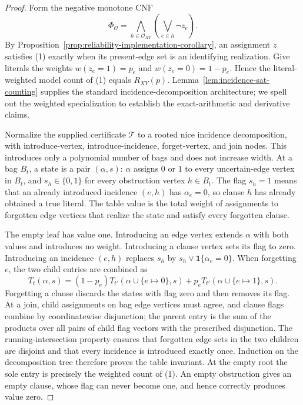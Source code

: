 \documentclass{article}
\begin{document}
\begin{proof}
Form the negative monotone CNF
\[
 \Phi_{\mathcal O}=\bigwedge_{h\in\mathcal O_{XY}}
 \left(\bigvee_{e\in h}\neg z_e\right). \tag{1}
\]
By Proposition~\ref{prop:reliability-implementation-corollary}, an assignment \(z\) satisfies (1) exactly when its present-edge set is an identifying realization.  Give literals the weights \(w(z_e=1)=p_e\) and \(w(z_e=0)=1-p_e\).  Hence the literal-weighted model count of (1) equals \(R_{XY}(p)\).  Lemma~\ref{lem:incidence-sat-counting} supplies the standard incidence-decomposition architecture; we spell out the weighted specialization to establish the exact-arithmetic and derivative claims.

Normalize the supplied certificate \(\mathcal T\) to a rooted nice incidence decomposition, with introduce-vertex, introduce-incidence, forget-vertex, and join nodes.  This introduces only a polynomial number of bags and does not increase width.  At a bag \(B_t\), a state is a pair \((\alpha,s)\): \(\alpha\) assigns \(0\) or \(1\) to every uncertain-edge vertex in \(B_t\), and \(s_h\in\{0,1\}\) for every obstruction vertex \(h\in B_t\).  The flag \(s_h=1\) means that an already introduced incidence \((e,h)\) has \(\alpha_e=0\), so clause \(h\) has already obtained a true literal.  The table value is the total weight of assignments to forgotten edge vertices that realize the state and satisfy every forgotten clause.

The empty leaf has value one.  Introducing an edge vertex extends \(\alpha\) with both values and introduces no weight.  Introducing a clause vertex sets its flag to zero.  Introducing an incidence \((e,h)\) replaces \(s_h\) by \(s_h\vee\mathbf 1\{\alpha_e=0\}\).  When forgetting \(e\), the two child entries are combined as
\[
 T_t(\alpha,s)=(1-p_e)T_{t'}(\alpha\cup\{e\mapsto0\},s)
                  +p_eT_{t'}(\alpha\cup\{e\mapsto1\},s). \tag{2}
\]
Forgetting a clause discards the states with flag zero and then removes its flag.  At a join, child assignments on bag edge vertices must agree, and clause flags combine by coordinatewise disjunction; the parent entry is the sum of the products over all pairs of child flag vectors with the prescribed disjunction.  The running-intersection property ensures that forgotten edge sets in the two children are disjoint and that every incidence is introduced exactly once.  Induction on the decomposition tree therefore proves the table invariant.  At the empty root the sole entry is precisely the weighted count of (1).  An empty obstruction gives an empty clause, whose flag can never become one, and hence correctly produces value zero.


\end{proof}
\end{document}
